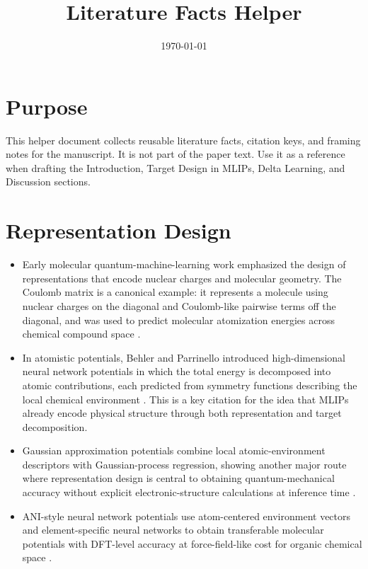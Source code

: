 \documentclass[11pt]{article}
\title{Literature Facts Helper}
\author{}
\date{\today}
\begin{document}
\maketitle

\section*{Purpose}

This helper document collects reusable literature facts, citation keys, and framing notes for the manuscript. It is not part of the paper text. Use it as a reference when drafting the Introduction, Target Design in MLIPs, Delta Learning, and Discussion sections.

\section{Representation Design}

\begin{itemize}
  \item Early molecular quantum-machine-learning work emphasized the design of representations that encode nuclear charges and molecular geometry. The Coulomb matrix is a canonical example: it represents a molecule using nuclear charges on the diagonal and Coulomb-like pairwise terms off the diagonal, and was used to predict molecular atomization energies across chemical compound space \cite{rupp2012fast}.

  \item In atomistic potentials, Behler and Parrinello introduced high-dimensional neural network potentials in which the total energy is decomposed into atomic contributions, each predicted from symmetry functions describing the local chemical environment \cite{behler2007generalized}. This is a key citation for the idea that MLIPs already encode physical structure through both representation and target decomposition.

  \item Gaussian approximation potentials combine local atomic-environment descriptors with Gaussian-process regression, showing another major route where representation design is central to obtaining quantum-mechanical accuracy without explicit electronic-structure calculations at inference time \cite{bartok2010gap}.

  \item ANI-style neural network potentials use atom-centered environment vectors and element-specific neural networks to obtain transferable molecular potentials with DFT-level accuracy at force-field-like cost for organic chemical space \cite{smith2017ani1}.
\end{itemize}
\end{document}
